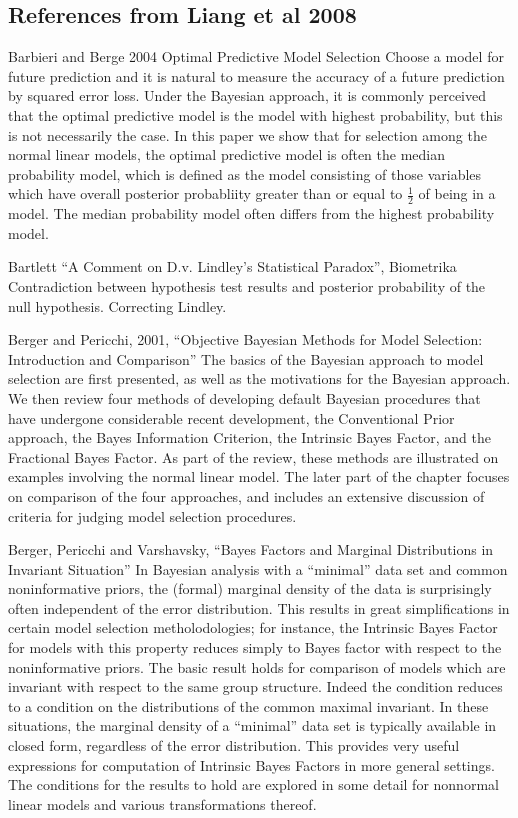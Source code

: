 \documentclass{amsart}[12pt]
\begin{document}
\subsection{References from Liang et al 2008}
Barbieri and Berge 2004 Optimal Predictive Model Selection
Choose a model for future prediction and it is natural to measure the accuracy of a future prediction by
squared error loss. Under the Bayesian approach, it is commonly perceived that the optimal predictive model is
the model with highest probability, but this is not necessarily the case. In this paper we show that for
selection among the normal linear models, the optimal predictive model is often the median probability model,
which is defined as the model consisting of those variables which have overall posterior probabliity greater
than or equal to $\frac{1}{2}$ of being in a model. The median probability model often differs from the highest
probability model.

Bartlett ``A Comment on D.v. Lindley's Statistical Paradox'', Biometrika
Contradiction between hypothesis test results and posterior probability of the null hypothesis. Correcting 
Lindley.

Berger and Pericchi, 2001, ``Objective Bayesian Methods for Model Selection: Introduction and Comparison''
The basics of the Bayesian approach to model selection are first presented, as well as the motivations for the
Bayesian approach. We then review four methods of developing default Bayesian procedures that have undergone
considerable recent development, the Conventional Prior approach, the Bayes Information Criterion, the
Intrinsic Bayes Factor, and the Fractional Bayes Factor. As part of the review, these methods are illustrated
on examples involving the normal linear model. The later part of the chapter focuses on comparison of the
four approaches, and includes an extensive discussion of criteria for judging model selection procedures.

Berger, Pericchi and Varshavsky, ``Bayes Factors and Marginal Distributions in Invariant Situation''
In Bayesian analysis with a ``minimal'' data set and common noninformative priors, the (formal) marginal
density of the data is surprisingly often independent of the error distribution. This results in great
simplifications in certain model selection metholodologies; for instance, the Intrinsic Bayes Factor for
models with this property reduces simply to Bayes factor with respect to the noninformative priors. The basic
result holds for comparison of models which are invariant with respect to the same group structure. Indeed the
condition reduces to a condition on the distributions of the common maximal invariant. In these situations,
the marginal density of a ``minimal'' data set is typically available in closed form, regardless of the error
distribution. This provides very useful expressions for computation of Intrinsic Bayes Factors in more general
settings. The conditions for the results to hold are explored in some detail for nonnormal linear models and
various transformations thereof.
\end{document}
